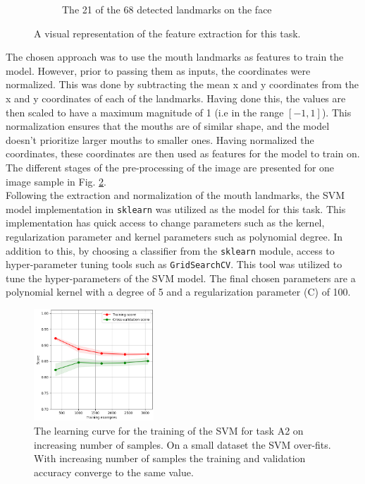 \documentclass{article}
\begin{document}
\begin{figure}[htb]
\begin{subfigure}{0.2\textwidth}
 				\caption{The 21 of the 68 detected landmarks on the face}
 				\label{fig:a2_mouth_landmarks}	
 			\end{subfigure}
 			\caption{A visual representation of the feature extraction for this task.}
 			\label{fig:a2_pre_processing}
 		\end{figure}
 		
 		The chosen approach was to use the mouth landmarks as features to train the model. However, prior to passing them as inputs, the coordinates were normalized. This was done by subtracting the mean x and y coordinates from the x and y coordinates of each of the landmarks. Having done this, the values are then scaled to have a maximum magnitude of 1 (i.e in the range $[-1, 1]$). This normalization ensures that the mouths are of similar shape, and the model doesn't prioritize larger mouths to smaller ones. Having normalized the coordinates, these coordinates are then used as features for the model to train on. The different stages of the pre-processing of the image are presented for one image sample in Fig. \ref{fig:a2_pre_processing}.
 		\\
 		
 		Following the extraction and normalization of the mouth landmarks, the SVM model implementation in {\tt sklearn} was utilized as the model for this task. This implementation has quick access to change parameters such as the kernel, regularization parameter and kernel parameters such as polynomial degree. In addition to this, by choosing a classifier from the {\tt sklearn} module, access to hyper-parameter tuning tools such as {\tt GridSearchCV}. This tool was utilized to tune the hyper-parameters of the SVM model. The final chosen parameters are a polynomial kernel with a degree of 5 and a regularization parameter (C) of 100. 
 		\\
 		
 		\begin{figure}[htb]
 			\centering
 			\includegraphics[width=0.4\textwidth]{a2_learning_curve.png}
 			\caption{The learning curve for the training of the SVM for task A2 on increasing number of samples. On a small dataset the SVM over-fits. With increasing number of samples the training and validation accuracy converge to the same value.}
 			\label{fig:a2_leraning_curve}
 		\end{figure}
 		
\end{document}
